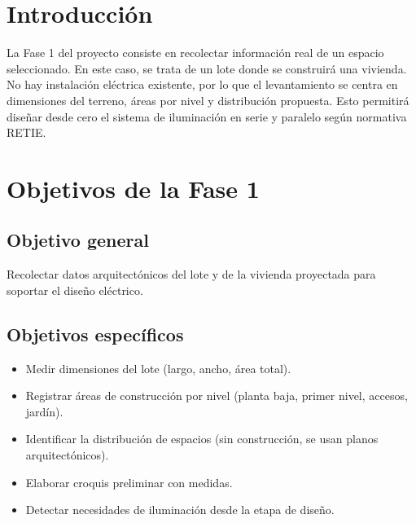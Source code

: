 
\section{Introducción}
La Fase 1 del proyecto consiste en recolectar información real de un espacio seleccionado. En este caso, se trata de un lote donde se construirá una vivienda. No hay instalación eléctrica existente, por lo que el levantamiento se centra en dimensiones del terreno, áreas por nivel y distribución propuesta. Esto permitirá diseñar desde cero el sistema de iluminación en serie y paralelo según normativa RETIE.

\section{Objetivos de la Fase 1}
\subsection{Objetivo general}
Recolectar datos arquitectónicos del lote y de la vivienda proyectada para soportar el diseño eléctrico.

\subsection{Objetivos específicos}
\begin{itemize}
    \item Medir dimensiones del lote (largo, ancho, área total).
    \item Registrar áreas de construcción por nivel (planta baja, primer nivel, accesos, jardín).
    \item Identificar la distribución de espacios (sin construcción, se usan planos arquitectónicos).
    \item Elaborar croquis preliminar con medidas.
    \item Detectar necesidades de iluminación desde la etapa de diseño.
\end{itemize}

